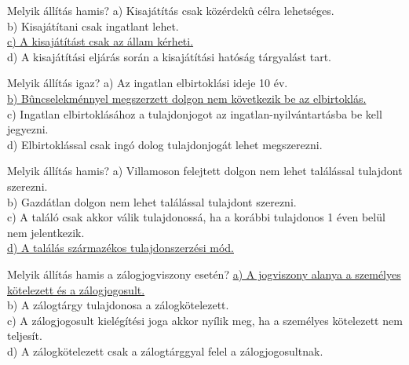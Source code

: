 \begin{frame}

\begin{tcolorbox}[title={121. Kérdés}]
Melyik állítás hamis?
\tcblower
a) Kisajátítás csak közérdekû célra lehetséges.\\
b) Kisajátítani csak ingatlant lehet.\\
\uline {c) A kisajátítást csak az állam kérheti.}\\
d) A kisajátítási eljárás során a kisajátítási hatóság tárgyalást tart.
\end{tcolorbox}
 
\begin{tcolorbox}[title={122. Kérdés}]
Melyik állítás igaz?
\tcblower
a) Az ingatlan elbirtoklási ideje 10 év.\\
\uline {b) Bûncselekménnyel megszerzett dolgon nem következik be az elbirtoklás.}\\
c) Ingatlan elbirtoklásához a tulajdonjogot az ingatlan-nyilvántartásba be kell jegyezni.\\
d) Elbirtoklással csak ingó dolog tulajdonjogát lehet megszerezni.
\end{tcolorbox}

\begin{tcolorbox}[title={123. Kérdés}]
Melyik állítás hamis?
\tcblower
a) Villamoson felejtett dolgon nem lehet találással tulajdont szerezni.\\
b) Gazdátlan dolgon nem lehet találással tulajdont szerezni.\\
c) A találó csak akkor válik tulajdonossá, ha a korábbi tulajdonos 1 éven belül nem jelentkezik.\\
\uline {d) A találás származékos tulajdonszerzési mód.}
\end{tcolorbox}

\begin{tcolorbox}[title={124. Kérdés}]
Melyik állítás hamis a zálogjogviszony esetén?
\tcblower
\uline {a) A jogviszony alanya a személyes kötelezett és a zálogjogosult.}\\
b) A zálogtárgy tulajdonosa a zálogkötelezett.\\
c) A zálogjogosult kielégítési joga akkor nyílik meg, ha a személyes kötelezett nem teljesít. \\
d) A zálogkötelezett csak a zálogtárggyal felel a zálogjogosultnak. 
\end{tcolorbox}

\end{frame}


